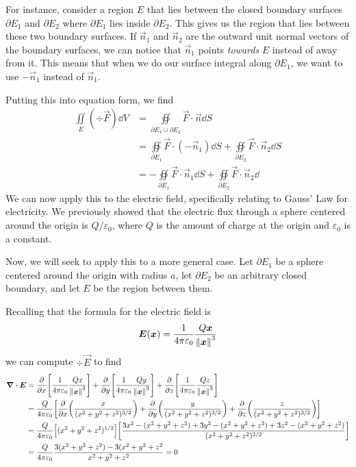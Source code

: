 For instance, consider a region $E$ that lies between the closed boundary surfaces $\partial E_1$ and $\partial E_2$ where $\partial E_1$ lies inside $\partial E_2$. This gives us the region that lies between these two boundary surfaces. If $\vec n_1$ and $\vec n_2$ are the outward unit normal vectors of the boundary surfaces, we can notice that $\vec n_1$ points \textit{towards} $E$ instead of away from it. This means that when we do our surface integral along $\partial E_1$, we want to use $-\vec n_1$ instead of $\vec n_1$.\par
Putting this into equation form, we find
\begin{align*}
    \iint\limits_E (\div \vec F)\dd V &= \oiint\limits_{\partial E_1 \cup \partial E_2}\vec F \cdot \vec n\dd S \\
    &= \oiint\limits_{\partial E_1}\vec F \cdot (-\vec n_1)\dd S + \oiint\limits_{\partial E_2}\vec F \cdot \vec n_2\dd S \\
    &=  -\oiint\limits_{\partial E_1}\vec F \cdot \vec n_1\dd S + \oiint\limits_{\partial E_2}\vec F \cdot \vec n_2\dd
\end{align*}
We can now apply this to the electric field, specifically relating to Gauss' Law for electricity. We previously showed that the electric flux through a sphere centered around the origin is $Q/\varepsilon_0$, where $Q$ is the amount of charge at the origin and $\varepsilon_0$ is a constant. \par
Now, we will seek to apply this to a more general case. Let $\partial E_1$ be a sphere centered around the origin with radius $a$, let $\partial E_2$ be an arbitrary closed boundary, and let $E$ be the region between them. \par
Recalling that the formula for the electric field is
\[ \boldsymbol{E}(\boldsymbol{x}) = \frac{1}{4\pi \varepsilon_0}\frac{Q\boldsymbol{x}}{\norm{\boldsymbol{x}}^3}\]
we can compute $\div \vec E$ to find
\begin{align*}
    \div \vec E &= \pdv{x}\bqty{ \frac{1}{4\pi \varepsilon_0}\frac{Qx}{\norm{\vec x}^3}}+\pdv{y}\bqty{ \frac{1}{4\pi \varepsilon_0}\frac{Qy}{\norm{\vec x}^3}}+\pdv{z}\bqty{ \frac{1}{4\pi \varepsilon_0}\frac{Qz}{\norm{\vec x}^3}} \\
    &= \frac{Q}{4\pi\varepsilon_0}\bqty{\pdv{x}\pqty{ \frac{x}{(x^2+y^2+z^2)^{3/2}}}+\pdv{y}\pqty{\frac{y}{(x^2+y^2+z^2)^{3/2}}}+\pdv{z}\pqty{ \frac{z}{(x^2+y^2+z^2)^{3/2}}}} \\
    &= \frac{Q}{4\pi\varepsilon_0}\bqty{(x^2+y^2+z^2)^{1/2}}\bqty{\frac{3x^2-(x^2+y^2+z^2)+3y^2-(x^2+y^2+z^2)+3z^2-(x^2+y^2+z^2)}{(x^2+y^2+z^2)^{3/2}}} \\
    &= \frac{Q}{4\pi\varepsilon_0}\frac{3(x^2+y^2+z^2)-3(x^2+y^2+z^2}{x^2+y^2+z^2} = 0
\end{align*}
